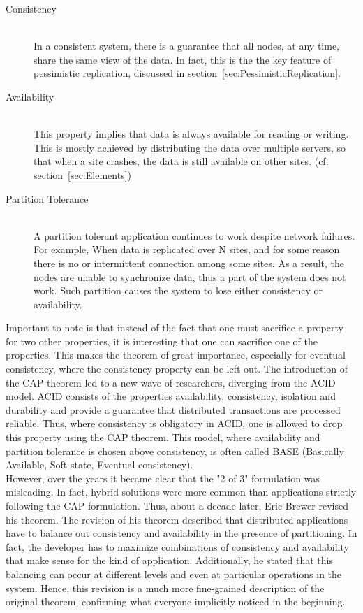 \documentclass[a4paper,12pt]{report}
\begin{document}
\begin{description}
 \item[Consistency] \hfill \\In a consistent system, there is a guarantee that all nodes, at any time, share the same view of the data. In fact, this is the the key feature of pessimistic replication, discussed in section~\ref{sec:PessimisticReplication}.
 \item[Availability] \hfill \\This property implies that data is always available for reading or writing. This is mostly achieved by distributing the data over multiple servers, so that when a site crashes, the data is still available on other sites. (cf. section~\ref{sec:Elements})
 \item[Partition Tolerance] \hfill \\A partition tolerant application continues to work despite network failures. For example, When data is replicated over N sites, and for some reason there is no or intermittent connection among some sites. As a result, the nodes are unable to synchronize data, thus a part of the system does not work. Such partition causes the system to lose either consistency or availability.
\end{description}

Important to note is that instead of the fact that one must sacrifice a property for two other properties, it is interesting that one can sacrifice one of the properties. This makes the theorem of great importance, especially for eventual consistency, where the consistency property can be left out. The introduction of the CAP theorem led to a new wave of researchers, diverging from the ACID model. ACID consists of the properties availability, consistency, isolation and durability and provide a guarantee that distributed transactions are processed reliable. Thus, where consistency is obligatory in ACID, one is allowed to drop this property using the CAP theorem. This model, where availability and partition tolerance is chosen above consistency, is often called BASE (Basically Available, Soft state, Eventual consistency). \\
However, over the years it became clear that the "2 of 3" formulation was misleading. In fact, hybrid solutions were more common than applications strictly following the CAP formulation. Thus, about a decade later, Eric Brewer revised his theorem. The revision of his theorem described that distributed applications have to balance out consistency and availability in the presence of partitioning. In fact, the developer has to maximize combinations of consistency and availability that make sense for the kind of application. Additionally, he stated that this balancing can occur at different levels and even at particular operations in the system. Hence, this revision is a much more fine-grained description of the original theorem, confirming what everyone implicitly noticed in the beginning. 
\end{document}
